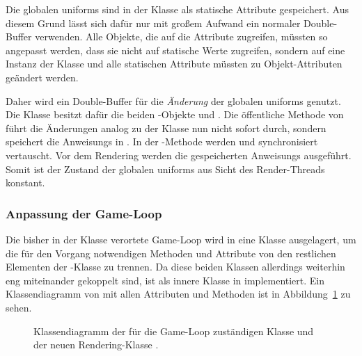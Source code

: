Die globalen \glspl{uniform} sind in der Klasse \classGlobalUniforms{} als statische Attribute gespeichert. Aus diesem Grund lässt sich dafür nur mit großem Aufwand ein normaler Double-Buffer verwenden. Alle Objekte, die auf die Attribute zugreifen, müssten so angepasst werden, dass sie nicht auf statische Werte zugreifen, sondern auf eine Instanz der Klasse und alle statischen Attribute müssten zu Objekt-Attributen geändert werden.

Daher wird ein Double-Buffer für die \emph{Änderung} der globalen \glspl{uniform} genutzt. Die Klasse \classMasterRenderer{} besitzt dafür die beiden \classRunnable{}-Objekte  und . Die öffentliche Methode  von \classMasterRenderer{} führt die Änderungen analog zu der Klasse \classLoader{} nun nicht sofort durch, sondern speichert die \glspl{Anweisung} in . In der -Methode werden  und  synchronisiert vertauscht. Vor dem Rendering werden die gespeicherten \glspl{Anweisung} ausgeführt. Somit ist der Zustand der globalen \glspl{uniform} aus Sicht des Render-Threads konstant.

\subsubsection{Anpassung der Game-Loop}\label{sec:adjustGameLoop}
Die bisher in der Klasse \classGame{} verortete Game-Loop wird in eine Klasse \classGameLoop{} ausgelagert, um die für den Vorgang notwendigen Methoden und Attribute von den restlichen Elementen der \classGame{}-Klasse zu trennen. Da diese beiden Klassen allerdings weiterhin eng miteinander gekoppelt sind, ist \classGameLoop{} als innere Klasse in \classGame{} implementiert. Ein Klassendiagramm von  \classGameLoop{} mit allen Attributen und Methoden ist in Abbildung~\ref{fig:DiagGameLoop} zu sehen.

\begin{figure}[htbp]
	\centering
	
	\caption[Klassendiagramm von \classGameLoop{} und \classRenderThread{}.]{Klassendiagramm der für die Game-Loop zuständigen Klasse \classGameLoop{} und der neuen Rendering-Klasse \classRenderThread{}.}\label{fig:DiagGameLoop}
\end{figure}

